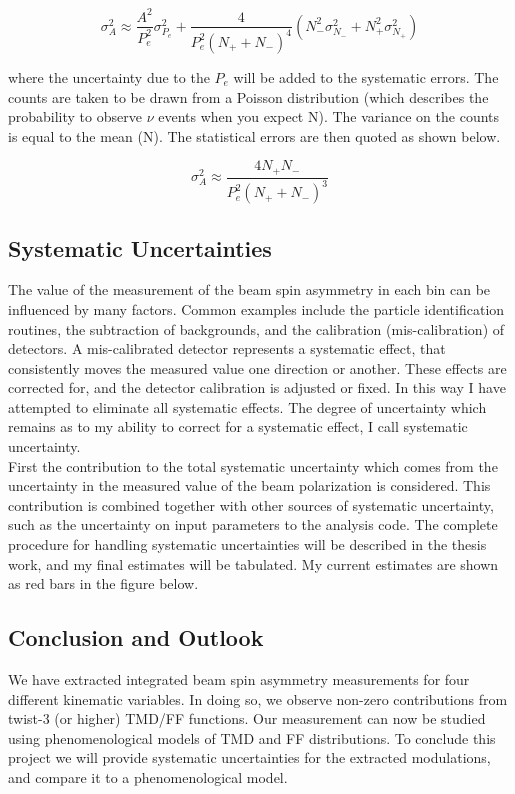 \begin{equation}
  \sigma_A^2 \approx \frac{A^2}{P_e^2} \sigma_{P_e}^2 + \frac{4}{P_e^2 (N_+ + N_-)^4}(N_-^2 \sigma_{N_-}^2 + N_+^2 \sigma_{N_+}^2) 
\end{equation}

where the uncertainty due to the $P_e$ will be added to the systematic errors.  The counts are taken to be drawn from a Poisson distribution (which describes the probability to observe $\nu$ events when you expect N).  The variance on the counts is equal to the mean (N).  The statistical errors are then quoted as shown below. 

\begin{equation}
  \sigma_A^2 \approx \frac{4N_+N_-}{P_e^2 (N_+ + N_-)^3} 
\end{equation}

\subsection{Systematic Uncertainties}

The value of the measurement of the beam spin asymmetry in each bin can be influenced by many factors.  Common examples include the particle identification routines, the subtraction of backgrounds, and the calibration (mis-calibration) of detectors.  A mis-calibrated detector represents a systematic effect, that consistently moves the measured value one direction or another.  These effects are corrected for, and the detector calibration is adjusted or fixed.  In this way I  have attempted to eliminate all systematic effects.  The degree of uncertainty which remains as to my ability to correct for a systematic effect, I call systematic uncertainty. \\

First the contribution to the total systematic uncertainty which comes from the uncertainty in the measured value of the beam polarization is considered.  This contribution is combined together with other sources of systematic uncertainty, such as the uncertainty on input parameters to the analysis code.  The complete procedure for handling systematic uncertainties will be described in the thesis work, and my final estimates will be tabulated.  My current estimates are shown as red bars in the figure below.


\subsection{Conclusion and Outlook}
We have extracted integrated beam spin asymmetry measurements for four different kinematic variables.  In doing so, we observe non-zero contributions from twist-3 (or higher) TMD/FF functions.  Our measurement can now be studied using phenomenological models of TMD and FF distributions.  To conclude this project we will provide systematic uncertainties for the extracted modulations, and compare it to a phenomenological model.
